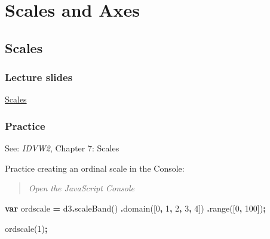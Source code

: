 \documentclass[
  openany]{book}
\newenvironment{Shaded}{\begin{snugshade}}{\end{snugshade}}
\newcommand{\DecValTok}[1]{\textcolor[rgb]{0.00,0.00,0.81}{#1}}
\newcommand{\FunctionTok}[1]{\textcolor[rgb]{0.00,0.00,0.00}{#1}}
\newcommand{\KeywordTok}[1]{\textcolor[rgb]{0.13,0.29,0.53}{\textbf{#1}}}
\newcommand{\NormalTok}[1]{#1}
\newcommand{\OperatorTok}[1]{\textcolor[rgb]{0.81,0.36,0.00}{\textbf{#1}}}
\begin{document}
\hypertarget{scales-and-axes}{%
\chapter{\texorpdfstring{Scales and Axes }{Scales and Axes }}\label{scales-and-axes}}

\hypertarget{scales}{%
\section{Scales}\label{scales}}

\hypertarget{lecture-slides-1}{%
\subsection{\texorpdfstring{Lecture slides }{Lecture slides }}\label{lecture-slides-1}}

\href{pdfs/scales.pdf}{Scales}

\hypertarget{practice}{%
\subsection{Practice}\label{practice}}

See: \emph{IDVW2}, Chapter 7: Scales

Practice creating an ordinal scale in the Console:

\begin{quote}
\emph{Open the JavaScript Console}
\end{quote}

\begin{Shaded}
\begin{Highlighting}[]
\KeywordTok{var}\NormalTok{ ordscale }\OperatorTok{=}\NormalTok{ d3}\OperatorTok{.}\FunctionTok{scaleBand}\NormalTok{()}
  \OperatorTok{.}\FunctionTok{domain}\NormalTok{([}\DecValTok{0}\OperatorTok{,} \DecValTok{1}\OperatorTok{,} \DecValTok{2}\OperatorTok{,} \DecValTok{3}\OperatorTok{,} \DecValTok{4}\NormalTok{])}
  \OperatorTok{.}\FunctionTok{range}\NormalTok{([}\DecValTok{0}\OperatorTok{,} \DecValTok{100}\NormalTok{])}\OperatorTok{;}
\end{Highlighting}
\end{Shaded}

\begin{Shaded}
\begin{Highlighting}[]
\NormalTok{ordscale(}\DecValTok{1}\NormalTok{)}\OperatorTok{;}
\end{Highlighting}
\end{Shaded}
\end{document}
